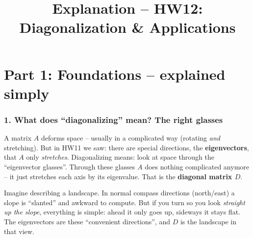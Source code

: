 \documentclass[a4paper,12pt]{article}
\title{Explanation -- HW12: Diagonalization \& Applications}
\author{}
\date{}
\begin{document}
\maketitle

\part*{Part 1: Foundations -- explained simply}

\section*{1. What does ``diagonalizing'' mean? The right glasses}

A matrix $A$ deforms space -- usually in a complicated way (rotating \emph{and} stretching). But in HW11 we saw: there are special directions, the \textbf{eigenvectors}, that $A$ only \emph{stretches}. Diagonalizing means: look at space through the ``eigenvector glasses''. Through these glasses $A$ does nothing complicated anymore -- it just stretches each axis by its eigenvalue. That is the \textbf{diagonal matrix $D$}.

\begin{center}
\end{center}

\begin{analogie}
Imagine describing a landscape. In normal compass directions (north/east) a slope is ``slanted'' and awkward to compute. But if you turn so you look \emph{straight up the slope}, everything is simple: ahead it only goes up, sideways it stays flat. The eigenvectors are these ``convenient directions'', and $D$ is the landscape in that view.
\end{analogie}
\end{document}
